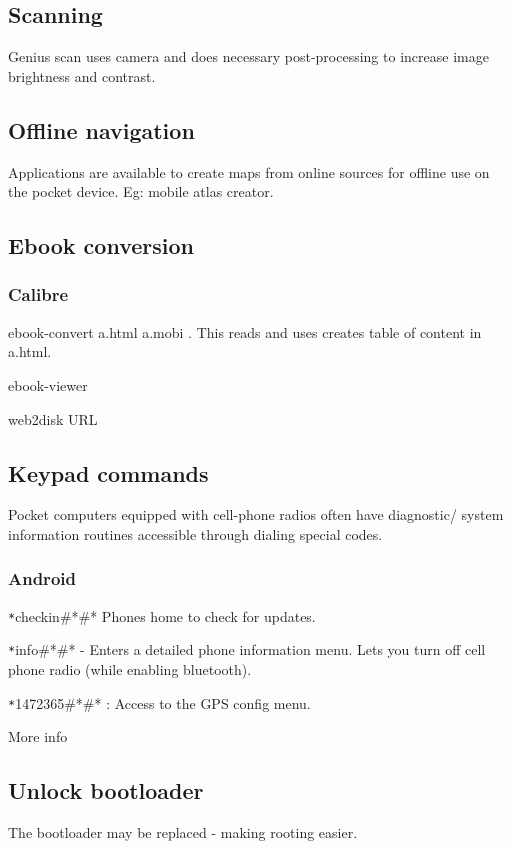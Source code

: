 \subsection{Scanning}
Genius scan uses camera and does necessary post-processing to increase image brightness and contrast.

\subsection{Offline navigation}
Applications are available to create maps from online sources for offline use on the pocket device. Eg: mobile atlas creator.



\subsection{Ebook conversion}
\subsubsection{Calibre}
ebook-convert a.html a.mobi . This reads and uses creates table of content in a.html.

ebook-viewer

web2disk URL

\subsection{Keypad commands}
Pocket computers equipped with cell-phone radios often have diagnostic/ system information routines accessible through dialing special codes.

\subsubsection{Android}
\verb *#*#checkin#*#* Phones home to check for updates.

\verb *#*#info#*#* - Enters a detailed phone information menu. Lets you turn off cell phone radio (while enabling bluetooth).

\verb *#*#1472365#*#* : Access to the GPS config menu.

More info 

\subsection{Unlock bootloader}
The bootloader may be replaced - making rooting easier.

